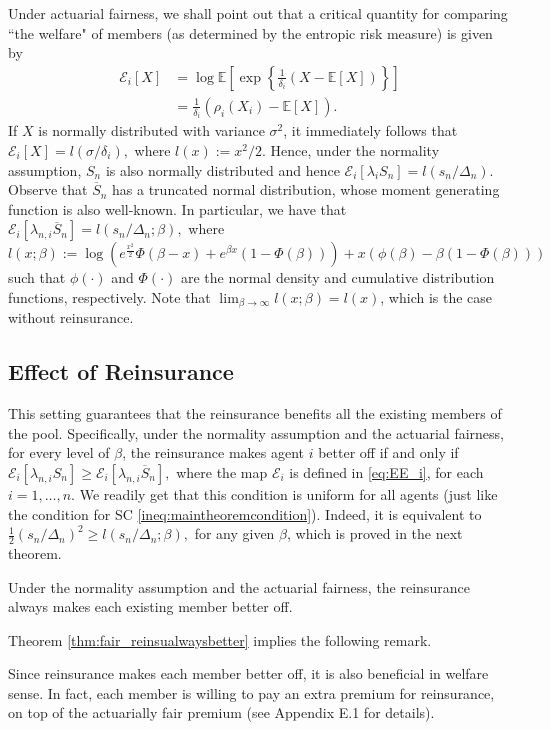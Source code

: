 \documentclass[fleqn,mnsc,nonblindrev]{informs4}
\newcommand{\EE}{\mathbb{E}}
\begin{document}
Under actuarial fairness, we shall point out that a critical quantity for comparing ``the welfare" of members (as determined by the entropic risk measure) is given by
\begin{equation}\label{eq:EE_i}
\begin{aligned}
\mathcal{E}_i[X]&=\log  \mathbb{E}\left[\exp\left\{\frac1{\delta_i}(X-\mathbb{E}[X])\right\}\right]\\
&=\frac{1}{\delta_i}\left(\rho_i(X_i)-\EE[X]\right).
\end{aligned}
\end{equation}
If $X$ is normally distributed with variance $\sigma^2$, it immediately follows that  {$\mathcal{E}_i[X]=l\left(\sigma/\delta_i\right),$ where $l(x):=x^2/2.$} Hence, under the normality assumption, $S_n$ is also normally distributed and hence  {$\mathcal{E}_i[\lambda_i S_n]=l\left(s_n/\Delta_n\right).$}
Observe that $\overline{S}_n$ has a truncated normal distribution, whose moment generating function is also well-known. In particular, we have that  {$\mathcal{E}_i[\lambda_{n,i} \overline{S}_n]=l\left(s_n/\Delta_n;\beta \right),$} where   {$l(x;\beta):=\log\left(e^{\frac{x^2}{2}}\Phi\left(\beta-x\right)+e^{\beta x}(1-\Phi(\beta))\right)+ x\left(\phi(\beta)-\beta(1-\Phi(\beta))\right)$ such that} $\phi(\cdot)$ and $\Phi(\cdot)$ are the normal density and cumulative distribution functions, respectively. Note that 
$\lim_{\beta\rightarrow \infty}l(x;\beta)=l(x)$, which is the case without reinsurance. 

\subsection{Effect of Reinsurance}\label{sec:Dec_eff_Rein}
This setting guarantees that the reinsurance benefits all the existing members of the pool.  {Specifically, under the normality assumption and the actuarial fairness, for every level of $\beta$, the reinsurance makes agent $i$  better off if and only if $\mathcal{E}_i[\lambda_{n,i} S_n]\ge \mathcal{E}_i[\lambda_{n,i} \overline{S}_n],$ where the map $\mathcal{E}_i$ is defined in \eqref{eq:EE_i}, for each $i=1,\dots,n$.} We readily get that  {this condition} is uniform for all agents (just like the condition for SC \eqref{ineq:maintheoremcondition}). Indeed,  {it} is equivalent to $\frac{1}{2}\left(s_n/\Delta_n\right)^2\geq l\left(s_n/\Delta_n;\beta\right),$ for any given $\beta$, which is proved in the next theorem.
\begin{theorem}\label{thm:fair_reinsualwaysbetter}
Under the normality assumption and the actuarial fairness, the reinsurance always makes each existing member better off.
\end{theorem}
  {Theorem \ref{thm:fair_reinsualwaysbetter} implies the following remark.}
\begin{remark}
  {Since reinsurance makes each member better off, it is also beneficial in welfare sense. In fact, each member is willing to pay an extra premium for reinsurance, on top of the actuarially fair premium (see Appendix E.1 %
for details).}
\end{remark}
\end{document}
